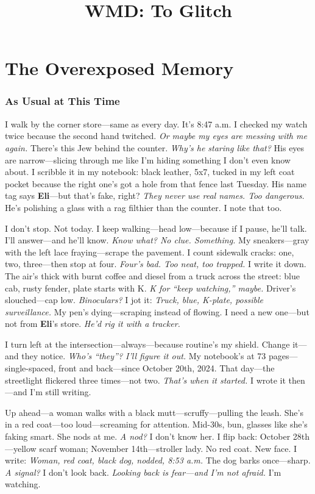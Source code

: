 \documentclass{article}
\title{WMD: To Glitch}
\author{}
\date{}
\begin{document}
\maketitle

\part {The Overexposed Memory}

\section*{As Usual at This Time}

I walk by the corner store—same as every day. It’s 8:47 a.m. I checked my watch twice because the second hand twitched. \textit{Or maybe my eyes are messing with me again.} There’s this Jew behind the counter. \textit{Why’s he staring like that?} His eyes are narrow—slicing through me like I’m hiding something I don’t even know about. I scribble it in my notebook: black leather, 5x7, tucked in my left coat pocket because the right one’s got a hole from that fence last Tuesday. His name tag says \textbf{Eli}—but that’s fake, right? \textit{They never use real names. Too dangerous.} He’s polishing a glass with a rag filthier than the counter. I note that too.

I don’t stop. Not today. I keep walking—head low—because if I pause, he’ll talk. I’ll answer—and he’ll know. \textit{Know what? No clue. Something.} My sneakers—gray with the left lace fraying—scrape the pavement. I count sidewalk cracks: one, two, three—then stop at four. \textit{Four’s bad. Too neat, too trapped.} I write it down. The air’s thick with burnt coffee and diesel from a truck across the street: blue cab, rusty fender, plate starts with K. \textit{K for “keep watching,” maybe.} Driver’s slouched—cap low. \textit{Binoculars?} I jot it: \textit{Truck, blue, K-plate, possible surveillance.} My pen’s dying—scraping instead of flowing. I need a new one—but not from \textbf{Eli}’s store. \textit{He’d rig it with a tracker.}

I turn left at the intersection—always—because routine’s my shield. Change it—and they notice. \textit{Who’s “they”? I’ll figure it out.} My notebook’s at 73 pages—single-spaced, front and back—since October 20th, 2024. That day—the streetlight flickered three times—not two. \textit{That’s when it started.} I wrote it then—and I’m still writing.

Up ahead—a woman walks with a black mutt—scruffy—pulling the leash. She’s in a red coat—too loud—screaming for attention. Mid-30s, bun, glasses like she’s faking smart. She nods at me. \textit{A nod?} I don’t know her. I flip back: October 28th—yellow scarf woman; November 14th—stroller lady. No red coat. New face. I write: \textit{Woman, red coat, black dog, nodded, 8:53 a.m.} The dog barks once—sharp. \textit{A signal?} I don’t look back. \textit{Looking back is fear—and I’m not afraid.} I’m watching.
\end{document}
